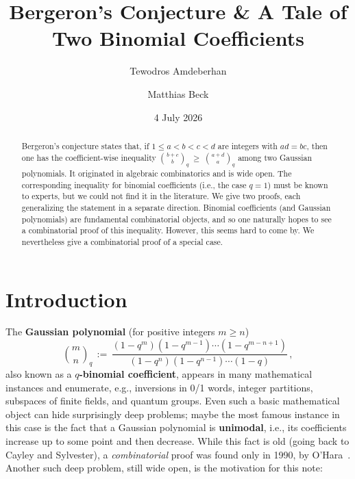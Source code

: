 \documentclass[11pt]{amsart}
\newcommand\Def[1]{{\bf #1}}
\newcommand{\gauss}[2]{{\binom{#1}{#2}}_q}
\begin{document}
\title[Bergeron's Conjecture]{Bergeron's Conjecture \& A Tale of Two Binomial Coefficients}

\author[T. Amdberhan]{Tewodros Amdeberhan}

\author[M. Beck]{Matthias Beck}


\begin{abstract}
Bergeron's conjecture states that, if $1\leq a<b<c<d$ are integers with $ad=bc$, then one has the coefficient-wise
inequality $\gauss{b+c}b \ \geq \ \gauss{a+d}a$ among two Gaussian polynomials. It originated in algebraic
combinatorics and is wide open. The corresponding inequality for binomial coefficients (i.e., the case $q=1$) must be
known to experts, but we could not find it in the literature. We give two proofs, each generalizing the statement in
a separate direction. Binomial coefficients (and Gaussian polynomials) are fundamental combinatorial objects, and so
one naturally hopes to see a combinatorial proof of this inequality. However, this seems hard to come by. We
nevertheless give a combinatorial proof of a special case.
\end{abstract}



\date{4 July 2026}

\maketitle


\section{Introduction}

The \Def{Gaussian polynomial} (for positive integers $m \ge n$)
\[
  \gauss m n \, := \, \frac{ (1-q^m) (1-q^{ m-1 }) \cdots (1-q^{ m-n+1 }) }{ (1-q^n) (1-q^{ n-1 }) \cdots (1-q) } \, ,
\]
also known as a \Def{$q$-binomial coefficient}, appears in many mathematical instances and enumerate, e.g., inversions
in 0/1 words, integer partitions, subspaces of finite fields, and quantum groups.
Even such a basic mathematical object can hide surprisingly deep problems; maybe the most famous instance in this case
is the fact that a Gaussian polynomial is \Def{unimodal}, i.e., its coefficients increase up to some point and then
decrease. While this fact is old (going back to Cayley and Sylvester), a \emph{combinatorial} proof was found only in
1990, by O'Hara~\cite{ohara}.
Another such deep problem, still wide open, is the motivation for this note:
\end{document}
